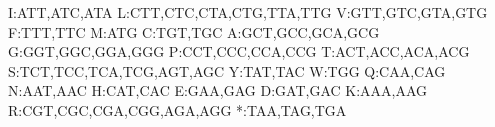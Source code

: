 I:ATT,ATC,ATA
L:CTT,CTC,CTA,CTG,TTA,TTG
V:GTT,GTC,GTA,GTG
F:TTT,TTC
M:ATG
C:TGT,TGC
A:GCT,GCC,GCA,GCG
G:GGT,GGC,GGA,GGG
P:CCT,CCC,CCA,CCG
T:ACT,ACC,ACA,ACG
S:TCT,TCC,TCA,TCG,AGT,AGC
Y:TAT,TAC
W:TGG
Q:CAA,CAG
N:AAT,AAC
H:CAT,CAC
E:GAA,GAG
D:GAT,GAC
K:AAA,AAG
R:CGT,CGC,CGA,CGG,AGA,AGG
*:TAA,TAG,TGA
